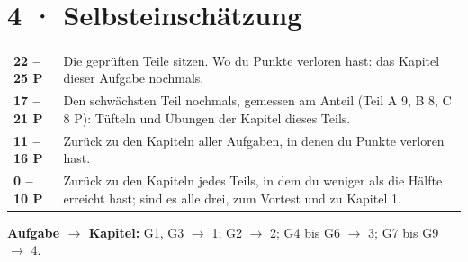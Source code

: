 \documentclass[11pt]{article}
\begin{document}
\section*{4 · Selbsteinschätzung}
\begin{tabularx}{\linewidth}{@{}l X@{}}
\toprule
\textbf{22 – 25 P} & Die geprüften Teile sitzen. Wo du Punkte verloren hast: das Kapitel dieser Aufgabe nochmals.\\
\textbf{17 – 21 P} & Den schwächsten Teil nochmals, gemessen am Anteil (Teil A 9, B 8, C 8 P): Tüfteln und Übungen der Kapitel dieses Teils.\\
\textbf{11 – 16 P} & Zurück zu den Kapiteln aller Aufgaben, in denen du Punkte verloren hast.\\
\textbf{0 – 10 P} & Zurück zu den Kapiteln jedes Teils, in dem du weniger als die Hälfte erreicht hast; sind es alle drei, zum Vortest und zu Kapitel 1.\\
\bottomrule
\end{tabularx}

\smallskip
\textbf{Aufgabe $\to$ Kapitel:} G1, G3 $\to$ 1; G2 $\to$ 2; G4 bis G6 $\to$ 3; G7 bis G9 $\to$ 4.
\end{document}

